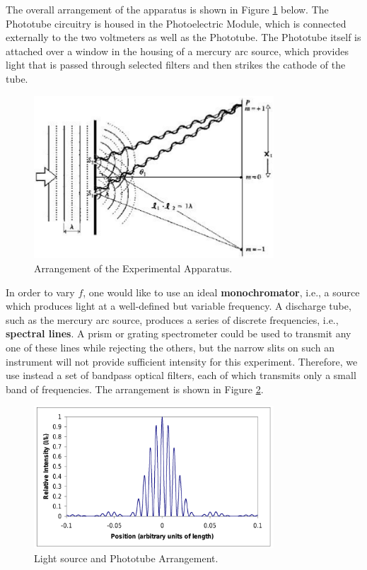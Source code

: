 The overall arrangement of the apparatus is shown in Figure {\ref{fig:apparatus}} below. The Phototube circuitry is housed in the Photoelectric Module, which is connected externally to the two voltmeters as well as the Phototube. The Phototube itself is attached over a window in the housing of a mercury arc source, which provides light that is passed through selected filters and then strikes the cathode of the tube. 
\begin{figure}[h]
\centering
\includegraphics[width=0.8\textwidth]{./Exp8/pic/image5.png}
\caption{Arrangement of the Experimental Apparatus.}
\label{fig:apparatus}
\end{figure} 

In order to vary $f$, one would like to use an ideal \textbf{monochromator}, i.e., a source which produces light at a well-defined but variable frequency. A discharge tube, such as the mercury arc source, produces a series of discrete frequencies, i.e., \textbf{spectral lines}. A prism or grating spectrometer could be used to transmit any one of these lines while rejecting the others, but the narrow slits on such an instrument will not provide sufficient intensity for this experiment. Therefore, we use instead a set of bandpass optical filters, each of which transmits only a small band of frequencies. The arrangement is shown in Figure {\ref{fig:light}}.
\begin{figure}[h]
\centering
\includegraphics[width=0.8\textwidth]{./Exp8/pic/image6.png}
\caption{Light source and Phototube Arrangement.}
\label{fig:light}
\end{figure} 

